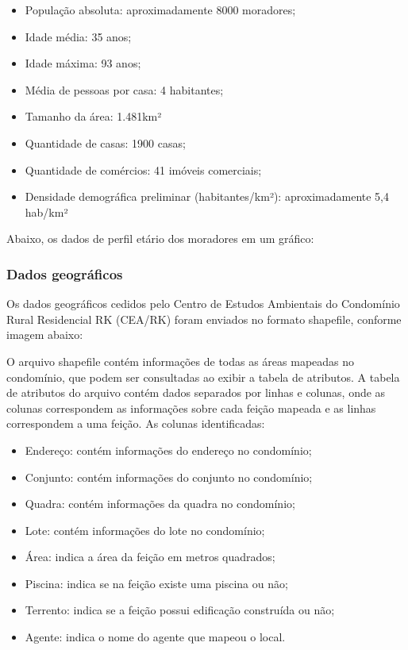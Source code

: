 \begin{itemize}
\item População absoluta: aproximadamente 8000 moradores;
\item Idade média: 35 anos;
\item Idade máxima: 93 anos;
\item Média de pessoas por casa: 4 habitantes;
\item Tamanho da área: 1.481km²
\item Quantidade de casas: 1900 casas;
\item Quantidade de comércios: 41 imóveis comerciais;
\item Densidade demográfica preliminar (habitantes/km²): aproximadamente 5,4 hab/km²
\end{itemize}

Abaixo, os dados de perfil etário dos moradores em um gráfico:


\subsubsection{Dados geográficos}

Os dados geográficos cedidos pelo Centro de Estudos Ambientais do Condomínio Rural Residencial RK (CEA/RK) foram enviados no formato shapefile, conforme imagem abaixo:


O arquivo shapefile contém informações de todas as áreas mapeadas no condomínio, que podem ser consultadas ao exibir a tabela de atributos. A tabela de atributos do arquivo contém dados separados por linhas e colunas, onde as colunas correspondem as informações sobre cada feição mapeada e as linhas correspondem a uma feição. As colunas identificadas:

\begin{itemize}
\item Endereço: contém informações do endereço no condomínio;
\item Conjunto: contém informações do conjunto no condomínio;
\item Quadra: contém informações da quadra no condomínio;
\item Lote: contém informações do lote no condomínio;
\item Área: indica a área da feição em metros quadrados;
\item Piscina: indica se na feição existe uma piscina ou não;
\item Terrento: indica se a feição possui edificação construída ou não;
\item Agente: indica o nome do agente que mapeou o local.
\end{itemize}


